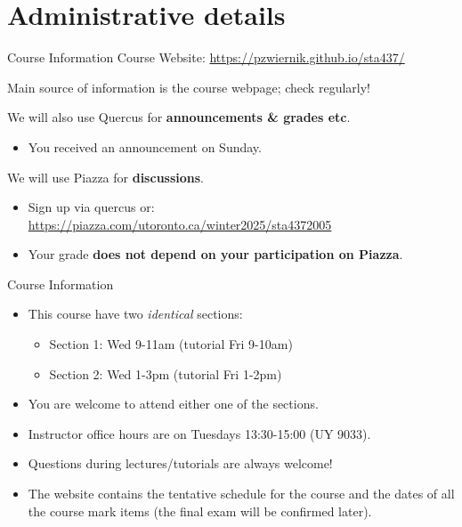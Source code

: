 \documentclass[11pt,handout,aspectratio=169]{beamer}
\begin{document}
\section{Administrative details}
\begin{frame}{Course Information}
Course Website: \url{https://pzwiernik.github.io/sta437/} 

\vspace{.5em}
Main source of information is the course webpage; check regularly!


We will also use \alert{Quercus} for {\bf announcements \& grades  etc}.

\begin{itemize}
\item You received an announcement on Sunday.
\end{itemize}
We will use \alert{Piazza} for {\bf discussions}.
\begin{itemize}
\item Sign up via quercus or: \url{https://piazza.com/utoronto.ca/winter2025/sta4372005}
\item Your grade {\bf does not depend on your participation on Piazza}. 
\end{itemize}
\end{frame}



\begin{frame}{Course Information}
\begin{itemize}
\item This course have two \emph{identical} sections:
  \begin{itemize}
  \item Section 1: Wed 9-11am (tutorial Fri 9-10am)  
  \item Section 2: Wed 1-3pm (tutorial Fri 1-2pm)  
  \end{itemize}
\item You are welcome to attend either one of the sections.
\item Instructor office hours are on Tuesdays 13:30-15:00 (UY 9033).
\item Questions during lectures/tutorials are always welcome!
\item The website contains the tentative schedule for the course and the dates of  all the course mark items (the final exam will be confirmed later). 
\end{itemize}
\end{frame}
\end{document}
